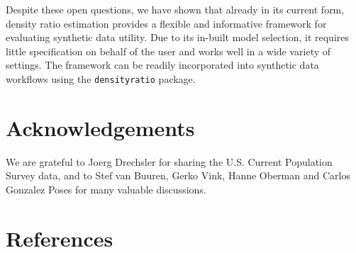 \documentclass[
]{article}
\begin{document}
Despite these open questions, we have shown that already in its current
form, density ratio estimation provides a flexible and informative
framework for evaluating synthetic data utility. Due to its in-built
model selection, it requires little specification on behalf of the user
and works well in a wide variety of settings. The framework can be
readily incorporated into synthetic data workflows using the
\texttt{densityratio} package.

\section*{Acknowledgements}\label{acknowledgements}

We are grateful to Joerg Drechsler for sharing the U.S. Current
Population Survey data, and to Stef van Buuren, Gerko Vink, Hanne
Oberman and Carlos Gonzalez Poses for many valuable discussions.

\section*{References}\label{references}
\end{document}
